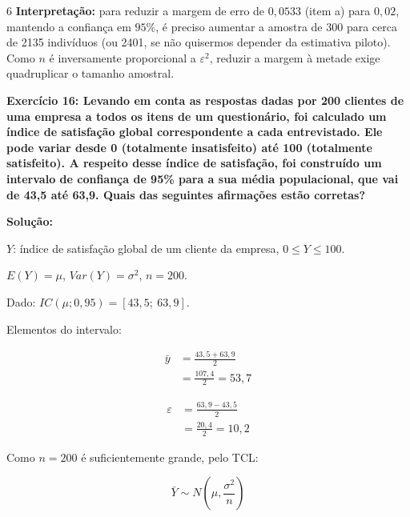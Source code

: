 \documentclass[8pt, a4paper, landscape]{extarticle}
\begin{document}
\begin{multicols}{6}
\textbf{Interpretação:} para reduzir a margem de erro de $0,0533$ (item a) para $0,02$, mantendo a confiança em $95\%$, é preciso aumentar a amostra de 300 para cerca de 2135 indivíduos (ou 2401, se não quisermos depender da estimativa piloto). Como $n$ é inversamente proporcional a $\varepsilon^2$, reduzir a margem à metade exige quadruplicar o tamanho amostral.

\textbf{Exercício 16: Levando em conta as respostas dadas por 200 clientes de uma empresa a todos os itens de um questionário, foi calculado um índice de satisfação global correspondente a cada entrevistado. Ele pode variar desde 0 (totalmente insatisfeito) até 100 (totalmente satisfeito). A respeito desse índice de satisfação, foi construído um intervalo de confiança de 95\% para a sua média populacional, que vai de 43,5 até 63,9. Quais das seguintes afirmações estão corretas?}

\vspace{0.3cm}

\textbf{Solução:}

$Y$: índice de satisfação global de um cliente da empresa, $0 \leq Y \leq 100$.

$E(Y) = \mu$, \quad $Var(Y) = \sigma^2$, \quad $n = 200$.

Dado: $IC(\mu;0,95) = [43,5;\ 63,9]$.

Elementos do intervalo:

\begin{equation*}
\begin{split}
\bar{y} &= \frac{43,5 + 63,9}{2} \\
&= \frac{107,4}{2} = 53,7
\end{split}
\end{equation*}

\begin{equation*}
\begin{split}
\varepsilon &= \frac{63,9 - 43,5}{2} \\
&= \frac{20,4}{2} = 10,2
\end{split}
\end{equation*}

Como $n = 200$ é suficientemente grande, pelo TCL:

\begin{equation*}
\bar{Y} \sim N\left(\mu, \frac{\sigma^2}{n}\right)
\end{equation*}


\end{multicols}
\end{document}
